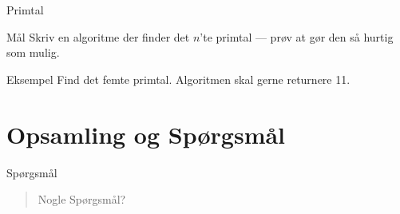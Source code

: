 \documentclass[12pt,t]{beamer}
\begin{document}
    \begin{frame}{Primtal}
      \begin{block}{Mål}
      Skriv en algoritme der finder det $n$'te primtal --- prøv at gør den så
      hurtig som mulig.
      \end{block}
      \pause

      \begin{exampleblock}{Eksempel}
      Find det femte primtal. Algoritmen skal gerne returnere 11.
      \end{exampleblock}
    \end{frame}



    \section{Opsamling og Spørgsmål}
        \begin{frame}[c]{Spørgsmål}
            \begin{quote}
                \centering Nogle Spørgsmål?
            \end{quote}
        \end{frame}
\end{document}
